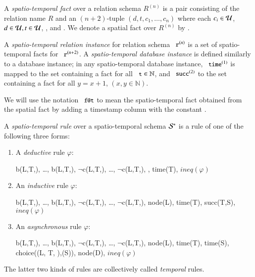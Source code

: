 A {\em spatio-temporal fact} over a relation schema $R^{(n)}$ is a pair consisting of the relation name $R$ and an $(n+2)$-tuple $(d,t,c_1,\ldots,c_n)$ where each $c_i \in \univ$, $d \in \univ, t \in \univ$, , and .  We denote a spatial fact over $R^{(n)}$ by .

A {\em spatio-temporal relation instance} for relation schema $\dedalus{r}^{(n)}$ is a set of spatio-temporal facts for
$\dedalus{r}^{(n+2)}$.  A {\em spatio-temporal database instance} is defined similarly to a database instance; in any spatio-temporal database instance, $\dedalus{time}^{(1)}$ is mapped to the set containing a  fact for all $\dedalus{t} \in \mathbb{N}$, and $\dedalus{succ}^{(2)}$ to the set containing a  fact for all $y = x + 1$, $(x,y \in \mathbb{N})$.

We will use the notation $\dedalus{f@t}$ to mean the spatio-temporal fact obtained from the spatial fact  by adding a timestamp column with the constant .

A {\em spatio-temporal rule} over a spatio-temporal schema $\stschema$ is a rule of one of the following three forms:

\begin{enumerate}
\item 
A {\em deductive} rule $\varphi$:

\begin{Drules}
        {b(L,T,), \ldots, b(L,T,), $\lnot$c(L,T,), \ldots, $\lnot$c(L,T,), , time(T), \(ineq(\varphi)\)}
\end{Drules}
\item 
An {\em inductive} rule $\varphi$:

\begin{Drules}
        {b(L,T,), \ldots, b(L,T,), $\lnot$c(L,T,), \ldots, $\lnot$c(L,T,), node(L), time(T), succ(T,S), \(ineq(\varphi)\)}
\end{Drules}
\item 
An {\em asynchronous} rule $\varphi$:

\begin{Drules}
        {b(L,T,), \ldots, b(L,T,),
          $\lnot$c(L,T,), \ldots, $\lnot$c(L,T,),
          node(L), time(T), time(S), choice((L, T, ),(S)), node(D), \(ineq(\varphi)\)}
\end{Drules}
\end{enumerate}
The latter two kinds of rules are collectively called {\em temporal} rules.

